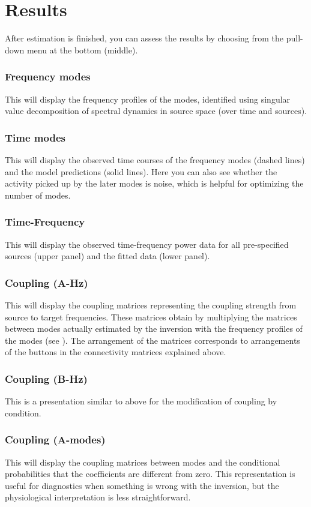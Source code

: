\section{Results}
After estimation is finished, you can assess the results by choosing from the pull-down menu at the bottom (middle).

\subsubsection{Frequency modes}
This will display the frequency profiles of the modes, identified using singular value decomposition of spectral dynamics in source space (over time and sources).

\subsubsection{Time modes}
This will display the observed time courses of the frequency modes (dashed lines) and the model predictions (solid lines). Here you can also see whether the activity picked up by the later modes is noise, which is helpful for optimizing the number of modes. 

\subsubsection{Time-Frequency}
This will display the observed time-frequency power data for all pre-specified sources (upper panel) and the fitted data (lower panel).

\subsubsection{Coupling (A-Hz)}
This will display the coupling matrices representing the coupling strength from source to target frequencies. These matrices obtain by multiplying the matrices between modes actually estimated by the inversion with the frequency profiles of the modes (see \cite{cc_induced}). The arrangement of the matrices corresponds to arrangements of the buttons in the connectivity matrices explained above.

\subsubsection{Coupling (B-Hz)}
This is a presentation similar to above for the modification of coupling by condition. 

\subsubsection{Coupling (A-modes)}
This will display the coupling matrices between modes and the conditional probabilities that the coefficients are different from zero. This representation is useful for diagnostics when something is wrong with the inversion, but the physiological interpretation is less straightforward.

